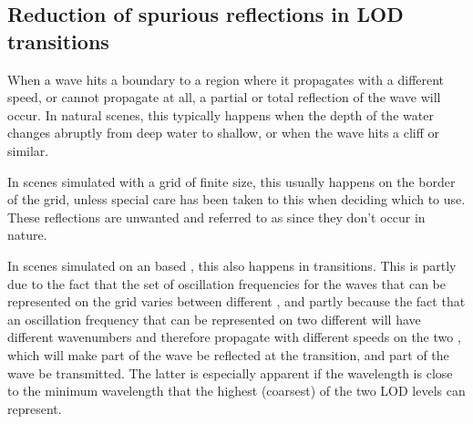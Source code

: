 

\subsection{Reduction of spurious reflections in LOD transitions}

When a wave hits a boundary to a region where it propagates with a different speed, or cannot propagate at all, a partial or total reflection of the wave will occur. In natural scenes, this typically happens when the depth of the water changes abruptly from deep water to shallow, or when the wave hits a cliff or similar.

In scenes simulated with a grid of finite size, this usually happens on the border of the grid, unless special care has been taken to this when deciding which  to use. These reflections are unwanted and referred to as  since they don't occur in nature.

In scenes simulated on an \octree based \grid, this also happens in \LOD transitions. This is partly due to the fact that the set of oscillation frequencies for the waves that can be represented on the grid varies between different \LODs, and partly because the fact that an oscillation frequency that can be represented on two different \LODs will have different wavenumbers and therefore propagate with different speeds on the two \LODs, which will make part of the wave be reflected at the transition, and part of the wave be transmitted. The latter is especially apparent if the wavelength is close to the minimum wavelength that the highest (coarsest) of the two LOD levels can represent.


